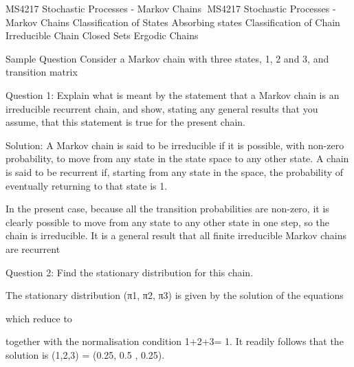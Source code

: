 ﻿MS4217 Stochastic Processes - Markov Chains
MS4217 Stochastic Processes - Markov Chains
Classification of States
Absorbing states
Classification of Chain
Irreducible Chain
Closed Sets
Ergodic Chains











Sample Question
Consider a Markov chain with three states, 1, 2 and 3, and transition matrix 



Question 1: Explain what is meant by the statement that a Markov chain is an irreducible recurrent chain, and show, stating any general results that you assume, that this statement is true for the present chain.
 
Solution: A Markov chain is said to be irreducible if it is possible, with non-zero probability, to move from any state in the state space to any other state. A chain is said to be recurrent if, starting from any state in the space, the probability of eventually returning to that state is 1.

In the present case, because all the transition probabilities are non-zero, it is clearly possible to move from any state to any other state in one step, so the chain is irreducible. It is a general result that all finite irreducible Markov chains are recurrent

Question 2: Find the stationary distribution for this chain.

The stationary distribution (π1, π2, π3) is given by the solution of the equations

	

which reduce to

	

together with the normalisation condition 1+2+3= 1.
It readily follows that the solution is (1,2,3) = (0.25, 0.5 , 0.25).
